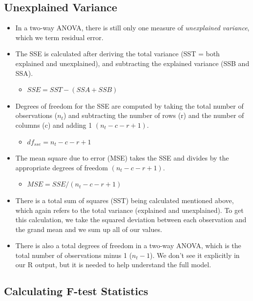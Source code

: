\documentclass[
  letterpaper,
  DIV=11,
  numbers=noendperiod]{scrreprt}
\providecommand{\tightlist}{%
  \setlength{\itemsep}{0pt}\setlength{\parskip}{0pt}}\usepackage{longtable,booktabs,array}
\begin{document}
\subsection{Unexplained Variance}\label{unexplained-variance-1}

\begin{itemize}
\item
  In a two-way ANOVA, there is still only one measure of
  \emph{unexplained variance}, which we term residual error.
\item
  The SSE is calculated after deriving the total variance (SST = both
  explained and unexplained), and subtracting the explained variance
  (SSB and SSA).

  \begin{itemize}
  \tightlist
  \item
    \(SSE = SST - (SSA + SSB)\)
  \end{itemize}
\item
  Degrees of freedom for the SSE are computed by taking the total number
  of observations (\(n_t\)) and subtracting the number of rows (r) and
  the number of columns (c) and adding 1 \((n_t-c-r+1)\).

  \begin{itemize}
  \tightlist
  \item
    \(df_{sse} = n_t-c-r+1\)
  \end{itemize}
\item
  The mean square due to error (MSE) takes the SSE and divides by the
  appropriate degrees of freedom \((n_t-c-r+1)\).

  \begin{itemize}
  \tightlist
  \item
    \(MSE = SSE/(n_t-c-r+1)\)
  \end{itemize}
\item
  There is a total sum of squares (SST) being calculated mentioned
  above, which again refers to the total variance (explained and
  unexplained). To get this calculation, we take the squared deviation
  between each observation and the grand mean and we sum up all of our
  values.
\item
  There is also a total degrees of freedom in a two-way ANOVA, which is
  the total number of observations minus 1 (\(n_t-1\)). We don't see it
  explicitly in our R output, but it is needed to help understand the
  full model.
\end{itemize}

\subsection{Calculating F-test
Statistics}\label{calculating-f-test-statistics}
\end{document}
